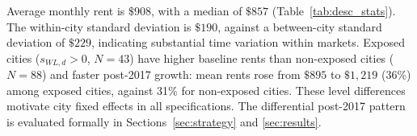 \documentclass[12pt]{article}
\begin{document}
Average monthly rent is $\$908$, with a median of $\$857$
(Table~\ref{tab:desc_stats}). The within-city standard deviation is
$\$190$, against a between-city standard deviation of $\$229$, indicating
substantial time variation within markets. Exposed cities ($s_{WL,d}>0$,
$N=43$) have higher baseline rents than non-exposed cities ($N=88$) and
faster post-2017 growth: mean rents rose from $\$895$ to $\$1{,}219$ (36\%)
among exposed cities, against 31\% for non-exposed cities. These level
differences motivate city fixed effects in all specifications. The
differential post-2017 pattern is evaluated formally in
Sections~\ref{sec:strategy} and \ref{sec:results}.

\end{document}
